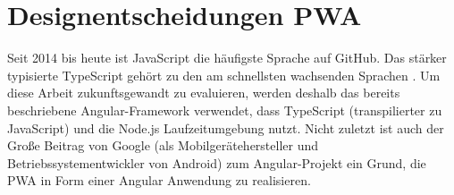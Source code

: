\section{Designentscheidungen PWA}
Seit 2014 bis heute ist JavaScript die häufigste Sprache auf GitHub. Das stärker typisierte TypeScript gehört zu den am schnellsten wachsenden Sprachen \cite{OctoverseGitHubStatistics}. Um diese Arbeit zukunftsgewandt zu evaluieren, werden deshalb das bereits beschriebene Angular-Framework verwendet, dass TypeScript (transpilierter zu JavaScript) und die Node.js Laufzeitumgebung nutzt. Nicht zuletzt ist auch der Große Beitrag von Google (als Mobilgerätehersteller und Betriebssystementwickler von Android) zum Angular-Projekt ein Grund, die PWA in Form einer Angular Anwendung zu realisieren.


